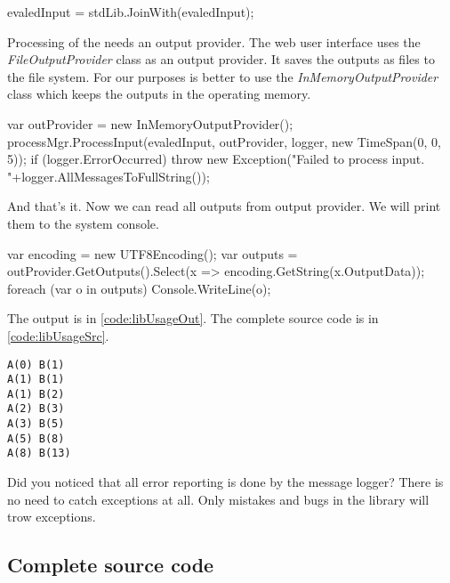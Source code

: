 \begin{Csharp}
evaledInput = stdLib.JoinWith(evaledInput);
\end{Csharp}

Processing of the \lsystems needs an output provider.
The web user interface uses the \emph{FileOutputProvider} class as an output provider.
It saves the outputs as files to the file system.
For our purposes is better to use the \emph{InMemoryOutputProvider} class which keeps the outputs in the operating memory.

\begin{Csharp}
var outProvider = new InMemoryOutputProvider();
processMgr.ProcessInput(evaledInput, outProvider, logger, new TimeSpan(0, 0, 5));
if (logger.ErrorOccurred) {
	throw new Exception("Failed to process input. "+logger.AllMessagesToFullString());
}
\end{Csharp}

And that's it.
Now we can read all outputs from output provider.
We will print them to the system console.

\begin{Csharp}
var encoding = new UTF8Encoding();
var outputs = outProvider.GetOutputs().Select(x => encoding.GetString(x.OutputData));
foreach (var o in outputs) {
	Console.WriteLine(o);
}
\end{Csharp}

The output is in \autoref{code:libUsageOut}.
The complete source code is in \autoref{code:libUsageSrc}.

\begin{lstlisting}
A(0) B(1) 
A(1) B(1) 
A(1) B(2) 
A(2) B(3) 
A(3) B(5) 
A(5) B(8) 
A(8) B(13)
\end{lstlisting}
\lstset{label=,caption=}

Did you noticed that all error reporting is done by the message logger?
There is no need to catch exceptions at all.
Only mistakes and bugs in the library will trow exceptions.



\subsection*{Complete source code}

